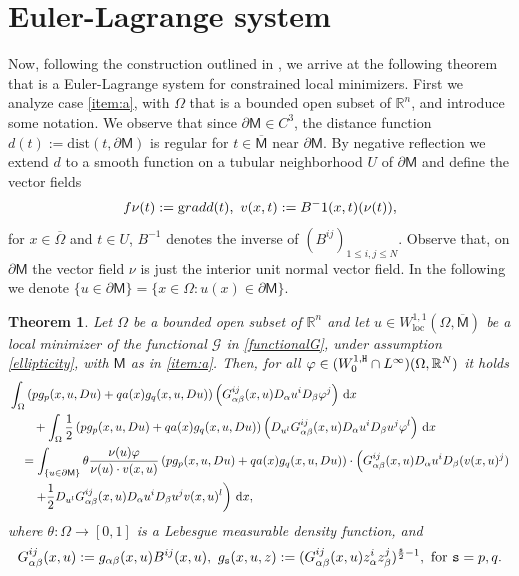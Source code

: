\documentclass[a4paper]{amsart}
\def\loc{\operatorname{loc}}
\newtheorem{theorem}{Theorem}[section]
\theoremstyle{plain}  %
\numberwithin{equation}{section}
\def\dx{\,{\rm d}x}
\newcommand{\R}{\mathbb{R}}
\newcommand{\mm}{\mathsf{M}}
\newcommand{\tx}[1]{\textnormal{\texttt{#1}}}
\def\loc{\operatorname{loc}}
\def\eqn#1$$#2$${\begin{equation}\label#1#2\end{equation}}
\begin{document}
\section{Euler-Lagrange system}
\noindent
Now, following the construction outlined in \cite[Theorem 2.1]{F1}, we arrive at the following theorem that is a Euler-Lagrange system for constrained local minimizers. First we analyze case \ref{item:a}, with  $\Omega$ that is a  bounded open subset of $\R^n$, and introduce some notation. We observe that since $\partial \mm \in C^3$, the distance function $d(t):= \text{dist}(t, \partial \mm)$ is regular for $t \in \overline{\mm}$ near $\partial \mm$. By negative reflection we extend $d$ to a smooth function on a tubular neighborhood $U$ of $\partial \mm$ and define the vector fields
\eqn{vf}
$$ \nu(t):= \text{grad} d(t), \ v(x,t):= B^{-1}(x,t)(\nu(t)),$$
for $x \in \overline{\Omega}$ and $t  \in U$, $B^{-1}$ denotes the inverse of $(B^{ij})_{1 \leq i, j \leq N}$. Observe that, on  $\partial \mm$ the vector field $\nu$ is just the interior unit normal vector field. In the following we denote $\{ u \in \partial \mm \} = \{x \in \Omega: u(x) \in \partial \mm \}$.
\begin{theorem}
  Let $\Omega$ be a  bounded open subset of $\R^n$ and let  $u \in W^{1,1}_{\loc}
    (\Omega, \overline{\mm})$ be a local minimizer of the functional $\mathcal{G}$ in \eqref{functionalG}, under assumption  \eqref{ellipticity}, with $\mm$ as in \ref{item:a}. Then, for all $\varphi \in (W^{1,\tx{H}}_0\cap L^{\infty})(\Omega, \R^N)$ it holds
    \begin{align} \label{equation}
    & \int_{\Omega} \left ( pg_p(x,u,Du) + qa(x)g_q(x,u,Du) \right )\left ( G^{ij}_{\alpha \beta}(x,u)D_\alpha u^i D_\beta \varphi^j\right ) \dx \notag  \\ & \qquad + \int_{\Omega} \frac{1}{2} \left ( pg_p(x,u,Du) + qa(x)g_q(x,u,Du)\right )\left ( D_{u^l}G^{ij}_{\alpha \beta} (x,u)D_\alpha u^i D_\beta u^j \varphi^l\right )   \dx \notag \\ 
& \quad = \int_{\{ u \in \partial \mm \}} \theta \frac{\nu(u)\varphi}{\nu(u) \cdot v(x,u)} \left ( pg_p(x,u,Du) + qa(x)g_q(x,u,Du)\right )\cdot \left ( G^{ij}_{\alpha \beta}(x,u)D_\alpha u^i D_\beta (v(x,u)^j) \right . \notag \\ & \qquad \left .+ \frac{1}{2}D_{u^l} G^{ij}_{\alpha \beta} (x,u) D_\alpha u^i D_\beta u^j v(x,u)^l\right )   \dx,
    \end{align}
    where $\theta: \Omega \to [0,1]$ is a Lebesgue measurable density function, and
    $$ G^{ij}_{\alpha \beta}(x,u) := g_{\alpha \beta}(x,u) B^{ij}(x,u), \ g_\tx{s} (x,u,z) := (G^{ij}_{\alpha \beta}(x,u)z_{\alpha}^i z_{\beta}^j)^{\frac{\tx{s}}{2}-1}, \ \text{for } \tx{s}=p,q.$$
\end{theorem}
\end{document}
